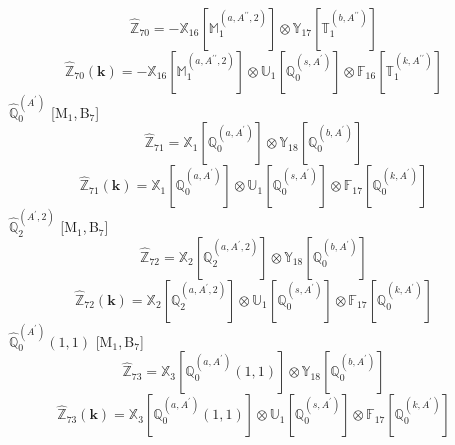 \documentclass[fleqn,10pt,landscape]{article}
\begin{document}
\begin{itemize}
\begin{dmath*}
\hat{\mathbb{Z}}_{70}=- \mathbb{X}_{16}[\mathbb{M}_{1}^{(a,A^{\prime\prime},2)}] \otimes\mathbb{Y}_{17}[\mathbb{T}_{1}^{(b,A^{\prime\prime})}]
\end{dmath*}
\begin{dmath*}
\hat{\mathbb{Z}}_{70}(\bm{k})=- \mathbb{X}_{16}[\mathbb{M}_{1}^{(a,A^{\prime\prime},2)}] \otimes\mathbb{U}_{1}[\mathbb{Q}_{0}^{(s,A^{\prime})}] \otimes\mathbb{F}_{16}[\mathbb{T}_{1}^{(k,A^{\prime\prime})}]
\end{dmath*}
\vspace{4mm}
\noindent {} $\,\,\,\hat{\mathbb{Q}}_{0}^{(A^{\prime})}$ [M$_{1}$,\,B$_{7}$]
\begin{dmath*}
\hat{\mathbb{Z}}_{71}=\mathbb{X}_{1}[\mathbb{Q}_{0}^{(a,A^{\prime})}] \otimes\mathbb{Y}_{18}[\mathbb{Q}_{0}^{(b,A^{\prime})}]
\end{dmath*}
\begin{dmath*}
\hat{\mathbb{Z}}_{71}(\bm{k})=\mathbb{X}_{1}[\mathbb{Q}_{0}^{(a,A^{\prime})}] \otimes\mathbb{U}_{1}[\mathbb{Q}_{0}^{(s,A^{\prime})}] \otimes\mathbb{F}_{17}[\mathbb{Q}_{0}^{(k,A^{\prime})}]
\end{dmath*}
\vspace{4mm}
\noindent {} $\,\,\,\hat{\mathbb{Q}}_{2}^{(A^{\prime},2)}$ [M$_{1}$,\,B$_{7}$]
\begin{dmath*}
\hat{\mathbb{Z}}_{72}=\mathbb{X}_{2}[\mathbb{Q}_{2}^{(a,A^{\prime},2)}] \otimes\mathbb{Y}_{18}[\mathbb{Q}_{0}^{(b,A^{\prime})}]
\end{dmath*}
\begin{dmath*}
\hat{\mathbb{Z}}_{72}(\bm{k})=\mathbb{X}_{2}[\mathbb{Q}_{2}^{(a,A^{\prime},2)}] \otimes\mathbb{U}_{1}[\mathbb{Q}_{0}^{(s,A^{\prime})}] \otimes\mathbb{F}_{17}[\mathbb{Q}_{0}^{(k,A^{\prime})}]
\end{dmath*}
\vspace{4mm}
\noindent {} $\,\,\,\hat{\mathbb{Q}}_{0}^{(A^{\prime})}(1,1)$ [M$_{1}$,\,B$_{7}$]
\begin{dmath*}
\hat{\mathbb{Z}}_{73}=\mathbb{X}_{3}[\mathbb{Q}_{0}^{(a,A^{\prime})}(1,1)] \otimes\mathbb{Y}_{18}[\mathbb{Q}_{0}^{(b,A^{\prime})}]
\end{dmath*}
\begin{dmath*}
\hat{\mathbb{Z}}_{73}(\bm{k})=\mathbb{X}_{3}[\mathbb{Q}_{0}^{(a,A^{\prime})}(1,1)] \otimes\mathbb{U}_{1}[\mathbb{Q}_{0}^{(s,A^{\prime})}] \otimes\mathbb{F}_{17}[\mathbb{Q}_{0}^{(k,A^{\prime})}]
\end{dmath*}
\vspace{4mm}

\end{itemize}
\end{document}
